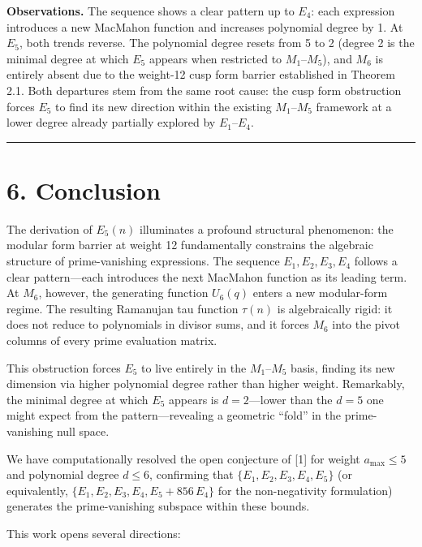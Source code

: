 \documentclass[
  11pt,
]{article}
\begin{document}
\textbf{Observations.} The sequence shows a clear pattern up to \(E_4\):
each expression introduces a new MacMahon function and increases
polynomial degree by 1. At \(E_5\), both trends reverse. The polynomial
degree resets from 5 to 2 (degree 2 is the minimal degree at which
\(E_5\) appears when restricted to \(M_1\)--\(M_5\)), and \(M_6\) is
entirely absent due to the weight-12 cusp form barrier established in
Theorem 2.1. Both departures stem from the same root cause: the cusp
form obstruction forces \(E_5\) to find its new direction within the
existing \(M_1\)--\(M_5\) framework at a lower degree already partially
explored by \(E_1\)--\(E_4\).

\begin{center}\rule{0.5\linewidth}{0.5pt}\end{center}

\section{6. Conclusion}\label{conclusion}

The derivation of \(E_5(n)\) illuminates a profound structural
phenomenon: the modular form barrier at weight 12 fundamentally
constrains the algebraic structure of prime-vanishing expressions. The
sequence \(E_1, E_2, E_3, E_4\) follows a clear pattern---each
introduces the next MacMahon function as its leading term. At \(M_6\),
however, the generating function \(U_6(q)\) enters a new modular-form
regime. The resulting Ramanujan tau function \(\tau(n)\) is
algebraically rigid: it does not reduce to polynomials in divisor sums,
and it forces \(M_6\) into the pivot columns of every prime evaluation
matrix.

This obstruction forces \(E_5\) to live entirely in the \(M_1\)--\(M_5\)
basis, finding its new dimension via higher polynomial degree rather
than higher weight. Remarkably, the minimal degree at which \(E_5\)
appears is \(d=2\)---lower than the \(d=5\) one might expect from the
pattern---revealing a geometric ``fold'' in the prime-vanishing null
space.

We have computationally resolved the open conjecture of {[}1{]} for
weight \(a_{\max} \leq 5\) and polynomial degree \(d \leq 6\),
confirming that \(\{E_1, E_2, E_3, E_4, E_5\}\) (or equivalently,
\(\{E_1, E_2, E_3, E_4, E_5 + 856\,E_4\}\) for the non-negativity
formulation) generates the prime-vanishing subspace within these bounds.

This work opens several directions:
\end{document}
